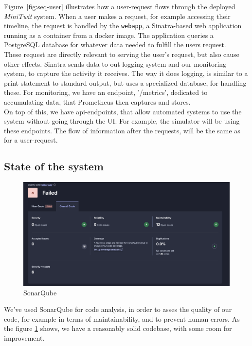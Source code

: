 Figure~\ref{fig:seq-user} illustrates how a user-request flows through the deployed \textit{MiniTwit} system. When a user makes a request, for example accessing their timeline, the request is handled by the \texttt{webapp}, a Sinatra-based web application running as a container from a docker image. The application queries a PostgreSQL database for whatever data needed to fulfill the users request. \\

These request are directly relevant to serving the user's request, but also cause other effects. Sinatra sends data to out logging system and our monitoring system, to capture the activity it receives. The way it does logging, is similar to a print statement to standard output, but uses a specialized database, for handling these. For monitoring, we have an endpoint, '/metrics', dedicated to accumulating data, that Prometheus then captures and stores.\\

On top of this, we have api-endpoints, that allow automated systems to use the system without going through the UI. For example, the simulator will be using these endpoints. The flow of information after the requests, will be the same as for a user-request. 

\subsection{State of the system}

\begin{figure}[H]
    \centering
    \includegraphics[width=1\linewidth]{images/sonarqube.png}
    \caption{SonarQube}
    \label{fig:sonarqube}
\end{figure}

We've used SonarQube for code analysis, in order to asses the quality of our code, for example in terms of maintainability, and to prevent human errors. As the figure \ref{fig:sonarqube} shows, we have a reasonably solid codebase, with some room for improvement. \\

